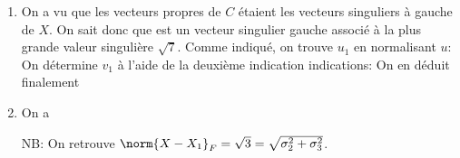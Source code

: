 \documentclass{article}
\begin{document}
\begin{enumerate}
	\item On a vu que les vecteurs propres de $C$ étaient les vecteurs singuliers à gauche de $X$. On sait donc que
	est un vecteur singulier gauche associé à la plus grande valeur singulière $\sqrt{7}$. Comme indiqué, on trouve $u_1$ en normalisant $u$:
	On détermine $v_1$ à l'aide de la deuxième indication indications:
	On en déduit finalement
	
	\item On a
	
	NB: On retrouve $\norm{X-X_1}_F = \sqrt{3} = \sqrt{\sigma_2^2 + \sigma_3^2}$.
	
\end{enumerate}
	
\end{document}
